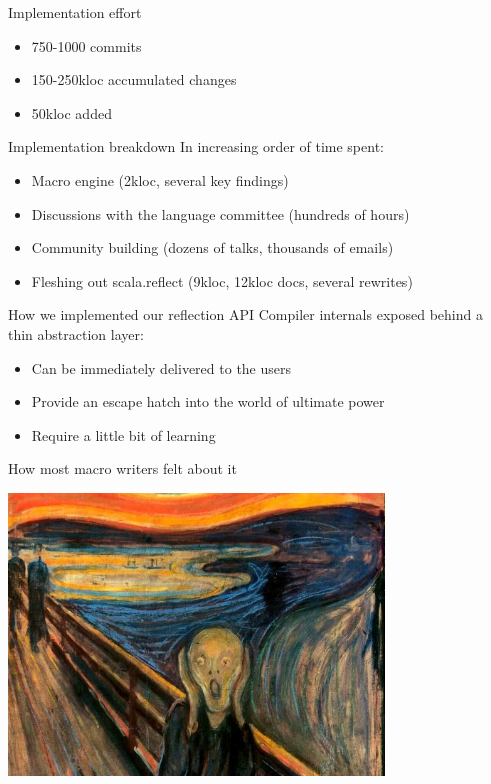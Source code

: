 \documentclass[svgnames,dvipsnames,hyperref={bookmarks=false},usepdftitle=false]{beamer}
\begin{document}

\begin{frame}{Implementation effort}
\begin{itemize}
\item 750-1000 commits
\item 150-250kloc accumulated changes
\item 50kloc added
\end{itemize}
\end{frame}

\begin{frame}{Implementation breakdown}
In increasing order of time spent:
\begin{itemize}
\item<1-> Macro engine (2kloc, several key findings)
\item<2-> Discussions with the language committee (hundreds of hours)
\item<3-> Community building (dozens of talks, thousands of emails)
\item<4-> \alert{Fleshing out scala.reflect (9kloc, 12kloc docs, several rewrites)}
\end{itemize}
\end{frame}


\begin{frame}{How we implemented our reflection API}
Compiler internals exposed behind a thin abstraction layer:
\begin{itemize}
\item Can be immediately delivered to the users
\item Provide an escape hatch into the world of ultimate power
\item Require a little bit of learning
\end{itemize}
\end{frame}

\begin{frame}{How most macro writers felt about it}
\vskip15pt
\begin{center}
\includegraphics[height=7.5cm]{scream.jpg}
\end{center}
\end{frame}
\end{document}
